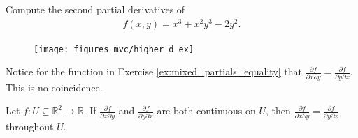 \documentclass[12pt,letterpaper,reqno]{article}
\numberwithin{equation}{section}
\newcommand{\R}{\ensuremath{\mathbb R}}
\begin{document}
{\newpage 

\begin{exercise}\label{ex:mixed_partials_equality}
Compute the second partial derivatives of 
\begin{align*}
	f(x,y)=x^3+x^2y^3-2y^2.
\end{align*}	
\end{exercise}

\begin{figure}[h]
	\begin{center}
		\texttt{[image: figures\_mvc/higher\_d\_ex]}
	\end{center}
\end{figure}
Notice for the function in Exercise \ref{ex:mixed_partials_equality} that $\frac{\partial f}{\partial x \partial y}=\frac{\partial f}{\partial y \partial x}$. This is no coincidence.

\begin{thm}\label{thm:clairaut}
Let $f:U \subseteq \R^2 \to \R$. If $\frac{\partial f}{\partial x \partial y}$ and $\frac{\partial f}{\partial y \partial x}$	are both continuous on $U$, then $\frac{\partial f}{\partial x \partial y}=\frac{\partial f}{\partial y \partial x}$ throughout $U$.
\end{thm}

}
\end{document}
